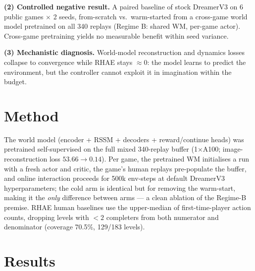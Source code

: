 \documentclass[10pt]{article}
\begin{document}
\textbf{(2) Controlled negative result.} A paired baseline of stock DreamerV3
on 6 public games $\times$ 2 seeds, from-scratch vs.\ warm-started from a
cross-game world model pretrained on all 340 replays (Regime B: shared WM,
per-game actor). Cross-game pretraining yields no measurable benefit within
seed variance.

\textbf{(3) Mechanistic diagnosis.} World-model reconstruction and dynamics
losses collapse to convergence while RHAE stays $\approx$0: the model learns
to predict the environment, but the controller cannot exploit it in
imagination within the budget.

\section{Method}
The world model (encoder + RSSM + decoders + reward/continue heads) was
pretrained self-supervised on the full mixed 340-replay buffer (1$\times$A100;
image-reconstruction loss $53.66\!\to\!0.14$). Per game, the pretrained WM
initialises a run with a fresh actor and critic, the game's human replays
pre-populate the buffer, and online interaction proceeds for 500k env-steps at
default DreamerV3 hyperparameters; the cold arm is identical but for removing
the warm-start, making it the \emph{only} difference between arms --- a clean
ablation of the Regime-B premise. RHAE human baselines use the upper-median of
first-time-player action counts, dropping levels with $<2$ completers from both
numerator and denominator (coverage 70.5\%, 129/183 levels).

\section{Results}
\end{document}
